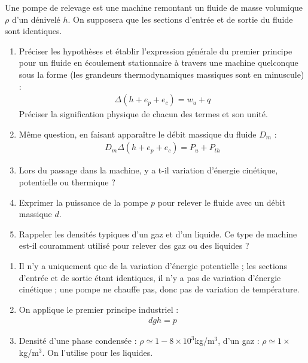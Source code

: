 Une pompe de relevage est une machine remontant un fluide de masse volumique $\rho$ d'un dénivelé $h$. On supposera que les sections d'entrée et de sortie du fluide sont identiques. 

\begin{enumerate}

	\item Préciser les hypothèses et établir l'expression générale du premier principe pour un fluide en écoulement stationnaire à travers une machine quelconque sous la forme (les grandeurs thermodynamiques massiques sont en minuscule) :
\begin{align*}
	\Delta (h+e_p+e_c)=w_u+q
\end{align*}
Préciser la signification physique de chacun des termes et son unité.
	\item Même question, en faisant apparaître le débit massique du fluide $D_m$ :
\begin{align*}
	D_m\Delta (h+e_p+e_c)=P_u+P_{th}
\end{align*}
	
	\item Lors du passage dans la machine, y a t-il variation d'énergie cinétique, potentielle ou thermique ?
	
	\item Exprimer la puissance de la pompe $p$ pour relever le fluide avec un débit massique $d$. 
	
	\item Rappeler les densités typiques d'un gaz et d'un liquide. Ce type de machine est-il couramment utilisé pour relever des gaz ou des liquides ?

\end{enumerate}

\newpage

\begin{correction}

\begin{enumerate}

	\item Il n'y a uniquement que de la variation d'énergie potentielle ; les sections d'entrée et de sortie étant identiques, il n'y a pas de variation d'énergie cinétique ; une pompe ne chauffe pas, donc pas de variation de température.
	
	\item On applique le premier principe industriel :
	\begin{align*}
		dgh = p
	\end{align*}
	
	\item Densité d'une phase condensée : $\rho\simeq1-8\times10^3$kg/m$^3$, d'un gaz : $\rho\simeq1\times$kg/m$^3$. On l'utilise pour les liquides.

\end{enumerate}

\end{correction}

